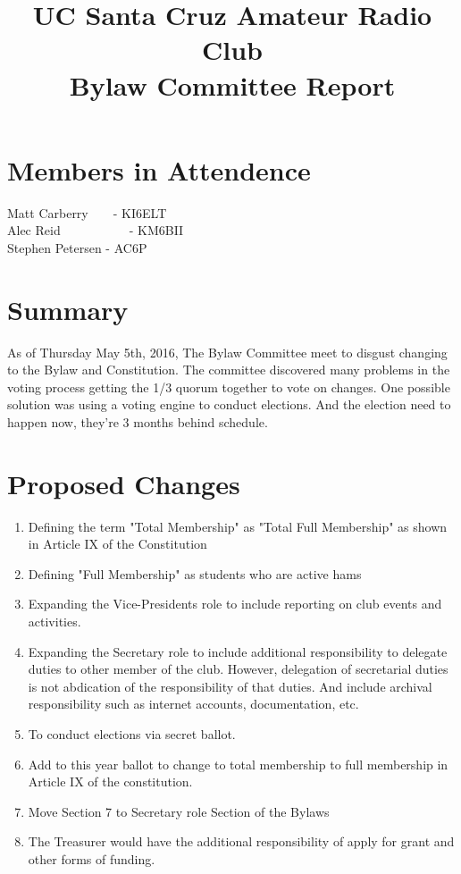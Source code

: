 \documentclass{article}
\begin{document}
\title{UC Santa Cruz Amateur Radio Club \\ Bylaw Committee Report}
\author{}
\date{}
\maketitle

\section*{Members in Attendence}
Matt Carberry~~~~- KI6ELT\\
Alec Reid~~~~~~~~~~~- KM6BII\\
Stephen Petersen - AC6P
\section*{Summary}
As of Thursday May 5th, 2016, The Bylaw Committee meet to disgust changing to the Bylaw and Constitution. The committee discovered many problems in the voting process getting the 1/3 quorum together to vote on changes. One possible solution was using a voting engine to conduct elections. And the election need to happen now, they're 3 months behind schedule.
 
\section*{Proposed Changes}
\begin{enumerate}
	\item Defining the term "Total Membership" as "Total Full Membership" as shown in Article IX of the Constitution 
	\item Defining "Full Membership" as students who are active hams
	\item Expanding the Vice-Presidents role to include reporting on club events and activities.
	\item Expanding the Secretary role to include  additional responsibility to delegate duties to other member of the club. However, delegation of secretarial duties is not abdication of the responsibility of that duties. And include archival responsibility such as internet accounts, documentation, etc.  
	\item To conduct elections via secret ballot. 
	\item Add to this year ballot to change to total membership to full membership in Article IX of the constitution.
	\item Move Section 7 to Secretary role Section of the Bylaws
	\item The Treasurer would have the additional responsibility of apply for grant and other forms of funding.
\end{enumerate}
\end{document}
